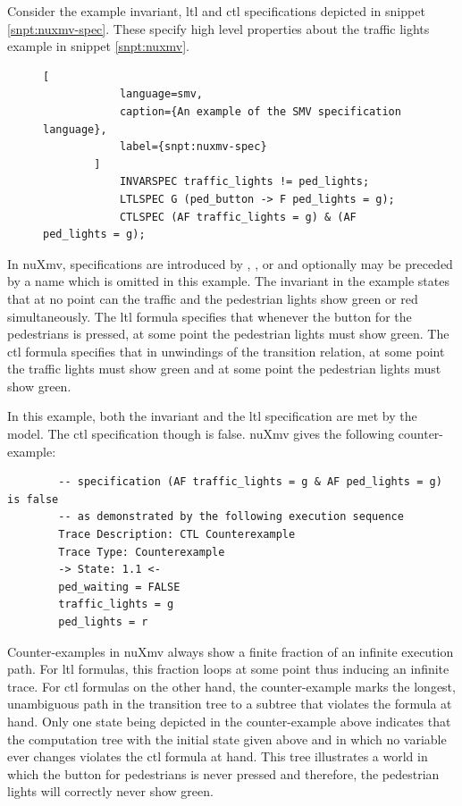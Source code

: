 \begin{example}
    Consider the example invariant, \gls{ltl} and \gls{ctl} specifications depicted in snippet \ref{snpt:nuxmv-spec}.
    These specify high level properties about the traffic lights example in snippet \ref{snpt:nuxmv}.

    \begin{figure}
        \begin{lstlisting}[
            language=smv,
            caption={An example of the SMV specification language},
            label={snpt:nuxmv-spec}
        ]
            INVARSPEC traffic_lights != ped_lights;
            LTLSPEC G (ped_button -> F ped_lights = g);
            CTLSPEC (AF traffic_lights = g) & (AF ped_lights = g);
        \end{lstlisting}
    \end{figure}


    In nuXmv, specifications are introduced by , , or  and optionally may be preceded by a name which is omitted in this example.
    The invariant in the example states that at no point can the traffic and the pedestrian lights show green or red simultaneously.
    The \gls{ltl} formula specifies that whenever the button for the pedestrians is pressed, at some point the pedestrian lights must show green.
    The \gls{ctl} formula specifies that in unwindings of the transition relation, at some point the traffic lights must show green and at some point the pedestrian lights must show green.

    In this example, both the invariant and the \gls{ltl} specification are met by the model.
    The \gls{ctl} specification though is false.
    nuXmv gives the following counter-example:

    \begin{lstlisting}
        -- specification (AF traffic_lights = g & AF ped_lights = g)  is false
        -- as demonstrated by the following execution sequence
        Trace Description: CTL Counterexample
        Trace Type: Counterexample
        -> State: 1.1 <-
        ped_waiting = FALSE
        traffic_lights = g
        ped_lights = r
    \end{lstlisting}

    Counter-examples in nuXmv always show a finite fraction of an infinite execution path.
    For \gls{ltl} formulas, this fraction loops at some point thus inducing an infinite trace.
    For \gls{ctl} formulas on the other hand, the counter-example marks the longest, unambiguous path in the transition tree to a subtree that violates the formula at hand.
    Only one state being depicted in the counter-example above indicates that the computation tree with the initial state given above and in which no variable ever changes violates the \gls{ctl} formula at hand.
    This tree illustrates a world in which the button for pedestrians is never pressed and therefore, the pedestrian lights will correctly never show green.


\end{example}
